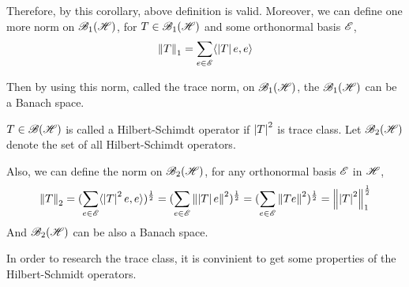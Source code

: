 \documentclass[a4paper,11pt]{report}
\begin{document}
Therefore, by this corollary, above definition is valid. Moreover, we can define one more norm on $\mathscr{B}_{1}\mathscr{(H)}$, for $T \in \mathscr{B}_{1}\mathscr{(H)}$ and some orthonormal basis $\mathscr{E}$,
\begin{equation*}
	\left\lVert T\right\lVert_1 = \sum_{e \in \mathscr{E}} \langle \left\lvert T\right\lvert e,e \rangle
\end{equation*}

Then by using this norm, called the trace norm, on $\mathscr{B}_{1}\mathscr{(H)}$, the $\mathscr{B}_{1}\mathscr{(H)}$ can be a Banach space.

\begin{defn}
	$T \in \mathscr{B(H)}$ is called a Hilbert-Schimdt operator if $\left\lvert T\right\lvert^2$ is trace class. Let $\mathscr{B}_{2}\mathscr{(H)}$ denote the set of all Hilbert-Schimdt operators. 
\end{defn}

Also, we can define the norm on $\mathscr{B}_{2}\mathscr{(H)}$, for any orthonormal basis $\mathscr{E}$ in $\mathscr{H}$,
\begin{equation*}
	\left\lVert T\right\lVert_2 = (\sum_{e \in \mathscr{E}} \langle \left\lvert T\right\lvert^2e,e \rangle)^{\frac{1}{2}} = (\sum_{e \in \mathscr{E}} \left\lVert\left\lvert T\right\lvert e\right\lVert^2)^{\frac{1}{2}} = (\sum_{e \in \mathscr{E}} \left\lVert Te\right\lVert^2)^{\frac{1}{2}} = \left\lVert\left\lvert T\right\lvert^2\right\lVert_1^{\frac{1}{2}}
\end{equation*}
And $\mathscr{B}_{2}\mathscr{(H)}$ can be also a Banach space.

In order to research the trace class, it is convinient to get some properties of the Hilbert-Schmidt operators.
\end{document}
